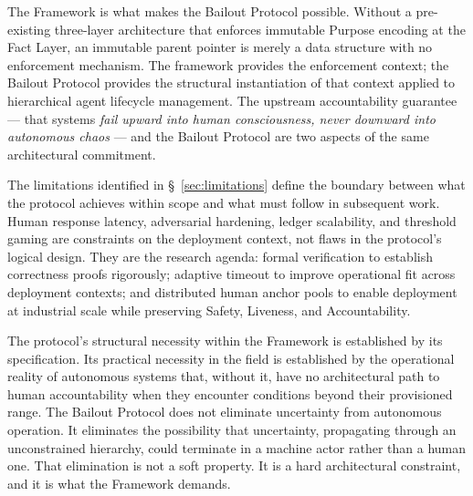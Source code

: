 The \bxthree{} Framework is what makes the Bailout Protocol possible. Without a pre-existing three-layer architecture that enforces immutable Purpose encoding at the Fact Layer, an immutable parent pointer is merely a data structure with no enforcement mechanism. The framework provides the enforcement context; the Bailout Protocol provides the structural instantiation of that context applied to hierarchical agent lifecycle management. The upstream accountability guarantee --- that \bxthree{} systems \emph{fail upward into human consciousness, never downward into autonomous chaos} --- and the Bailout Protocol are two aspects of the same architectural commitment.

The limitations identified in \S~\ref{sec:limitations} define the boundary between what the protocol achieves within scope and what must follow in subsequent work. Human response latency, adversarial hardening, ledger scalability, and threshold gaming are constraints on the deployment context, not flaws in the protocol's logical design. They are the research agenda: formal verification to establish correctness proofs rigorously; adaptive timeout to improve operational fit across deployment contexts; and distributed human anchor pools to enable deployment at industrial scale while preserving Safety, Liveness, and Accountability.

The protocol's structural necessity within the \bxthree{} Framework is established by its specification. Its practical necessity in the field is established by the operational reality of autonomous systems that, without it, have no architectural path to human accountability when they encounter conditions beyond their provisioned range. The Bailout Protocol does not eliminate uncertainty from autonomous operation. It eliminates the possibility that uncertainty, propagating through an unconstrained hierarchy, could terminate in a machine actor rather than a human one. That elimination is not a soft property. It is a hard architectural constraint, and it is what the \bxthree{} Framework demands.